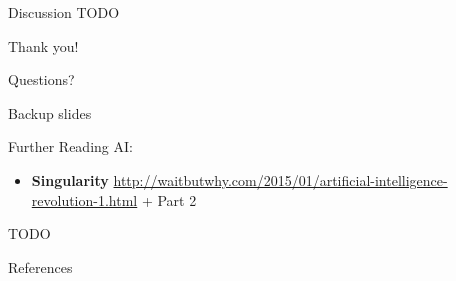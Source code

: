 \documentclass{beamer}
\newcommand{\todo}{\alert{TODO}}
\begin{document}
  \begin{frame}{Discussion}
    \todo
  \end{frame}

  \begin{frame}[standout]
    \begin{center}
      Thank you!
      \pause

      Questions?
    \end{center}
  \end{frame}


  \appendix

  \begin{frame}[standout]
    Backup slides
  \end{frame}

  \begin{frame}{Further Reading}
    AI:
    \begin{itemize}
      \item \textbf{Singularity} \url{http://waitbutwhy.com/2015/01/artificial-intelligence-revolution-1.html} + Part 2
    \end{itemize}

    \todo
  \end{frame}

  \begin{frame}[allowframebreaks]{References}
    \tiny
    \printbibliography[heading=none]
  \end{frame}
\end{document}
